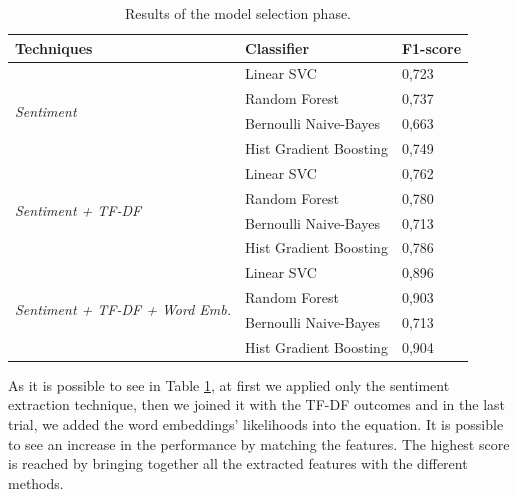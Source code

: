 \documentclass[conference]{IEEEtran}
\begin{document}
\begin{table}[h]
\begin{tabular}{@{}lll@{}}
\toprule
\textbf{Techniques}                                     & \textbf{Classifier}                       & \textbf{F1-score} \\ \midrule
\multirow{4}{*}{\textit{Sentiment}}                     & Linear SVC                       & 0,723    \\
                                               & Random Forest         & 0,737    \\
                                               & Bernoulli Naive-Bayes            & 0,663    \\
                                               & Hist Gradient Boosting & 0,749    \\ \midrule
\multirow{4}{*}{\textit{Sentiment + TF-DF}}             & Linear SVC                       & 0,762    \\
                                               & Random Forest         & 0,780    \\
                                               & Bernoulli Naive-Bayes            & 0,713    \\
                                               & Hist Gradient Boosting & 0,786    \\ \midrule
\multirow{4}{*}{\textit{Sentiment + TF-DF + Word Emb.}} & Linear SVC                       & 0,896    \\
                                               & Random Forest         & 0,903    \\
                                               & Bernoulli Naive-Bayes            & 0,713    \\
                                               & Hist Gradient Boosting & 0,904    \\ \bottomrule
\end{tabular}
\caption{Results of the model selection phase.}
\label{tab:techniques}
\end{table}
As it is possible to see in Table \ref{tab:techniques}, at first we applied only the sentiment extraction technique, then we joined it with the TF-DF outcomes and in the last trial, we added the word embeddings' likelihoods into the equation. It is possible to see an increase in the performance by matching the features. The highest score is reached by bringing together all the extracted features with the different methods.

\end{document}
